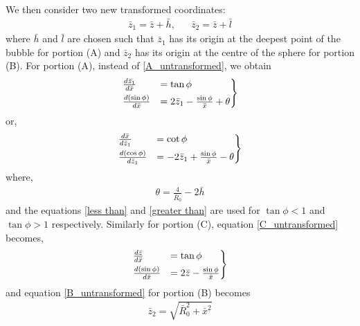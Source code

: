 We then consider two new transformed coordinates:
\begin{align}
    \bar{z}_1 = \bar{z}+\bar{h}, && \bar{z}_2=\bar{z}+\bar{l}
\end{align}
where $\bar{h}$ and $\bar{l}$ are chosen such that $\bar{z}_1$ has its origin at the deepest point of the bubble for portion (A) and $\bar{z}_2$ has its origin at the centre of the sphere for portion (B). For portion (A), instead of \ref{A_untransformed}, we obtain
\begin{align}\label{less than}
\begin{rcases}   
    \frac{d\bar{z}_1}{d\bar{x}} &= \tan \phi \\
    \frac{d(\sin\phi)}{d\bar{x}} &= 2\bar{z}_1 - \frac{\sin\phi}{\bar{x}} + \theta
\end{rcases} 
\end{align}
or,
\begin{align}\label{greater than}
\begin{rcases}
    \frac{d\bar{x}}{d\bar{z}_1} &= \cot \phi \\
    \frac{d(\cos\phi)}{d\bar{z}_1} &= -2\bar{z}_1 + \frac{\sin\phi}{\bar{x}} - \theta
\end{rcases}
\end{align}
where,
\begin{align}
    \theta = \frac{4}{\bar{R}_0} - 2\bar{h}
\end{align}
and the equations \ref{less than} and \ref{greater than} are used for $\tan\phi <1$ and $\tan\phi >1$ respectively. Similarly for portion (C), equation \ref{C_untransformed} becomes,
\begin{align}\label{C_transformed}
\begin{rcases}   
    \frac{d\bar{z}}{d\bar{x}} &= \tan \phi \\
    \frac{d(\sin\phi)}{d\bar{x}} &= 2\bar{z} - \frac{\sin\phi}{\bar{x}}
\end{rcases} 
\end{align}
and equation \ref{B_untransformed} for portion (B) becomes
\begin{align}
    \bar{z}_2 = \sqrt{ \bar{R}_0^2+\bar{x}^2}
\end{align}

